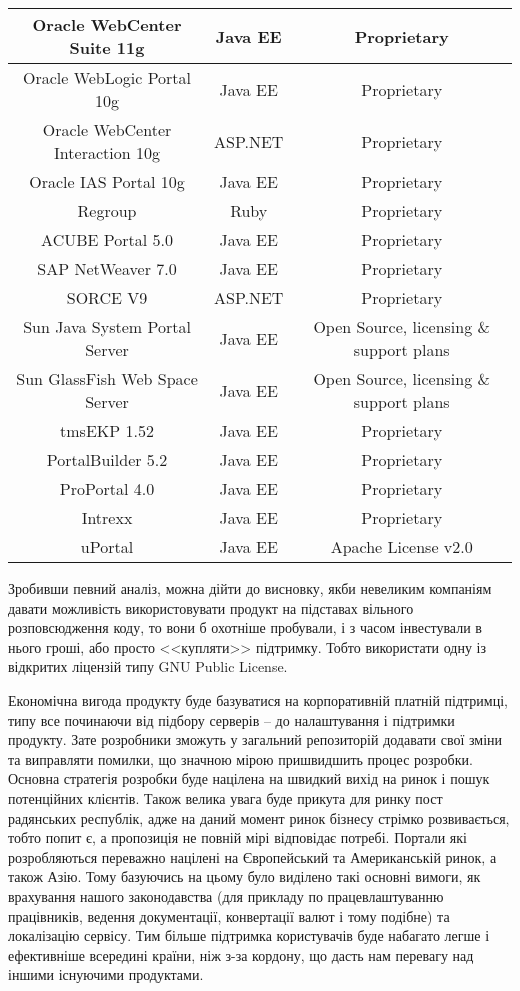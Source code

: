 {\begin{longtable}{|c|c|c|}
 Oracle WebCenter Suite 11g & Java EE & Proprietary \\ \hline
 Oracle WebLogic Portal 10g & Java EE & Proprietary \\ \hline
 Oracle WebCenter Interaction 10g & ASP.NET & Proprietary \\ \hline
 Oracle IAS Portal 10g & Java EE & Proprietary \\ \hline
 Regroup & Ruby & Proprietary \\ \hline
 ACUBE Portal 5.0 & Java EE & Proprietary \\ \hline
 SAP NetWeaver 7.0 & Java EE & Proprietary \\ \hline
 SORCE V9 & ASP.NET & Proprietary \\ \hline
 Sun Java System Portal Server & Java EE & Open Source, licensing \& support plans \\ \hline
 Sun GlassFish Web Space Server  & Java EE & Open Source, licensing \& support plans \\ \hline
 tmsEKP 1.52 & Java EE & Proprietary \\ \hline
 PortalBuilder 5.2 & Java EE & Proprietary \\ \hline
 ProPortal 4.0 & Java EE & Proprietary \\ \hline
 Intrexx & Java EE & Proprietary \\ \hline
 uPortal & Java EE & Apache License v2.0 \\ \hline

\end{longtable}
}


Зробивши певний аналіз, можна дійти до висновку, якби невеликим компаніям давати можливість використовувати продукт на підставах вільного розповсюдження коду, то вони б охотніше пробували, і з часом інвестували в нього гроші, або просто <<купляти>> підтримку.
Тобто використати одну із відкритих ліцензій типу GNU Public License.
\par Економічна вигода продукту буде базуватися на корпоративній платній підтримці, типу все починаючи від підбору серверів -- до налаштування і підтримки продукту.
Зате розробники зможуть у загальний репозиторій додавати свої зміни та виправляти помилки, що значною мірою пришвидшить процес розробки.
Основна стратегія розробки буде націлена на швидкий вихід на ринок і пошук потенційних клієнтів.
Також велика увага буде прикута для ринку пост радянських республік, адже на даний момент ринок бізнесу стрімко розвивається, тобто попит є, а пропозиція не повній мірі відповідає потребі.
Портали які розробляються переважно націлені на Європейський та Американській ринок, а також Азію.
Тому базуючись на цьому було виділено такі основні вимоги, як врахування нашого законодавства (для прикладу по працевлаштуванню працівників, ведення документації, конвертації валют і тому подібне) та локалізацію сервісу.
Тим більше підтримка користувачів буде набагато легше і ефективніше всередині країни, ніж з-за кордону, що дасть нам перевагу над іншими існуючими продуктами.

